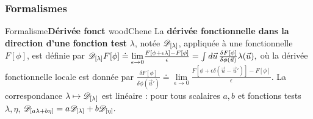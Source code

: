 \vspace{-0.5cm}
\subsubsection{Formalismes}

\EncadreDeux
{Formalisme}{{\bf \textsf{Dérivée fonct} \textsf{}}}{woodChene}{
La {\bf dérivée fonctionnelle dans la direction d’une fonction test} $\lambda$,
notée $\mathscr{D}_{[\lambda]}$, appliquée à une fonctionnelle $F[\phi]$, est définie
par \( \mathscr{D}_{[\lambda]}F[\phi] \doteq \underset{\epsilon\to0}{\lim}
\frac{F[\phi+\epsilon\lambda]-F[\phi]}{\epsilon} = \int d\vec{u}\, \frac{\delta
    F[\phi]}{\delta\phi(\vec{u})} \lambda(\vec{u}), \) où la dérivée fonctionnelle
locale est donnée par \( \frac{\delta F[\phi]}{\delta\phi(\vec{u}')} \doteq
\underset{\epsilon\to0}{\lim} \frac{ F[\phi+\epsilon\delta(\vec{u}-\vec{u}')] -
    F[\phi] }{\epsilon}. \) La correspondance $\lambda\mapsto\mathscr{D}_{[\lambda]}$ est
linéaire : pour tous scalaires $a,b$ et fonctions tests $\lambda,\eta$, \(
\mathscr{D}_{[a\lambda+b\eta]} = a\mathscr{D}_{[\lambda]} + b\mathscr{D}_{[\eta]}. \)
}

